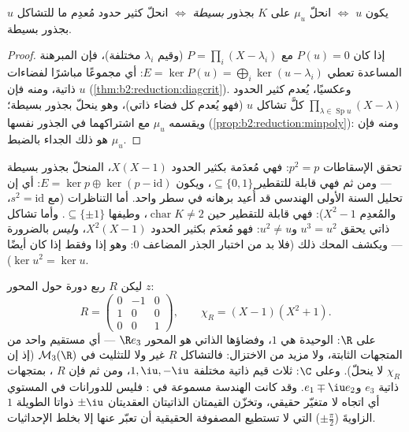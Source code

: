 \begin{corollary}\label{cor:b2:reduction:minpolycrit}
يكون $u$  $\iff$ انحلّ $\mu_u$ على $K$ بجذور
\emph{بسيطة} $\iff$ انحلّ كثير حدود مُعدِم ما للتشاكل $u$
بجذور بسيطة.
\end{corollary}

\begin{proof}
إذا كان $P(u) = 0$ مع $P = \prod_{i}(X - \lambda_i)$ (وقيم $\lambda_i$ مختلفة)، فإن المبرهنة المساعدة تعطي $E = \ker P(u) = \bigoplus_i \ker(u -
\lambda_i)$: أي مجموعًا مباشرًا لفضاءات ذاتية، ومنه فإن $u$ 
(\cref{thm:b2:reduction:diagcrit}). وعكسيًا، يُعدم كثير الحدود $\prod_{\lambda \in \operatorname{Sp}u}(X -
\lambda)$ كلَّ تشاكل $u$  (فهو يُعدم كل فضاء ذاتي)، وهو ينحلّ بجذور
بسيطة؛ ويقسمه $\mu_u$ مع اشتراكهما في الجذور نفسها
(\cref{prop:b2:reduction:minpoly}): ومنه فإن $\mu_u$ هو ذلك الجداء بالضبط.
\end{proof}

\begin{example}\label{ex:b2:reduction:projections}
تحقق الإسقاطات $p^2 = p$: فهي مُعدَمة بكثير الحدود $X(X-1)$، المنحلّ بجذور
بسيطة --- ومن ثم فهي قابلة للتقطير  $\subseteq \{0, 1\}$، ويكون $E =
\ker p \oplus \ker(p - \mathrm{id})$: أي إن تحليل السنة الأولى الهندسي
قد أُعيد برهانه في سطر واحد. أما التناظرات (مع $s^2 = \mathrm{id}$،
والمُعدِم $X^2 - 1$): فهي قابلة للتقطير حين $\operatorname{char} K
\neq 2$، وطيفها $\subseteq \{\pm 1\}$. وأما تشاكل ذاتي يحقق $u^3 =
u^2$ و$u^2 \neq u$: فهو مُعدَم بكثير الحدود $X^2(X - 1)$، و\emph{ليس}
 بالضرورة --- ويكشف المحك ذلك (فلا بد من اختبار الجذر
المضاعف $0$: وهو  إذا وفقط إذا كان أيضًا $\ker u^2 = \ker
u$).
\end{example}

\begin{example}\label{ex:b2:reduction:rotation3d}
ليكن $R$ ربع دورة حول المحور $z$:
\[
R = \begin{pmatrix}
0 & -1 & 0\\
1 & 0 & 0\\
0 & 0 & 1
\end{pmatrix},
\qquad
\chi_R = (X - 1)(X^2 + 1).
\]
على $\R$:  الوحيدة هي $1$، وفضاؤها الذاتي هو المحور
$\R e_3$ --- أي مستقيم واحد من المتجهات الثابتة، ولا مزيد من
الاختزال: فالتشاكل $R$ غير  ولا للتثليث في
$\mathcal{M}_3(\R)$ (إذ إن $\chi_R$ لا ينحلّ). وعلى $\C$: ثلاث
قيم ذاتية مختلفة $1, \iu, -\iu$، ومن ثم فإن $R$ ،
بمتجهات ذاتية $e_3$ و$e_1 \mp \iu e_2$. وقد كانت الهندسة
مسموعة في : فليس للدورانات في المستوي أي اتجاه
لا متغيّر حقيقي، وتخزّن القيمتان الذاتيتان العقديتان $\pm\iu$ ذواتا
الطويلة $1$ الزاويةَ ($\pm\frac\pi2$) التي لا تستطيع المصفوفة
الحقيقية أن تعبّر عنها إلا بخلط الإحداثيات.
\end{example}

